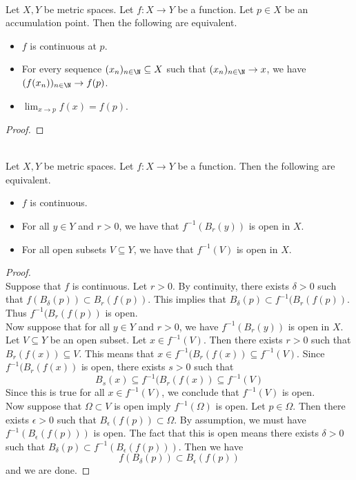\documentclass[a4paper]{article}
\begin{document}
\begin{prp}{}{}\\
Let $X,Y$ be metric spaces. Let $f:X\to Y$ be a function. Let $p\in X$ be an accumulation point. Then the following are equivalent. 
\begin{itemize}
\item $f$ is continuous at $p$. 
\item For every sequence $(x_n)_{n\in\N}\subseteq X$ such that $(x_n)_{n\in\N}\to x$, we have $(f(x_n))_{n\in\N}\to f(p)$. 
\item $\lim_{x\to p}f(x)=f(p)$. 
\end{itemize}
\begin{proof}
\end{proof}
\end{prp}

\begin{prp}{}{}\\
Let $X,Y$ be metric spaces. Let $f:X\to Y$ be a function. Then the following are equivalent. 
\begin{itemize}
\item $f$ is continuous. 
\item For all $y\in Y$ and $r>0$, we have that $f^{-1}(B_r(y))$ is open in $X$. 
\item For all open subsets $V\subseteq Y$, we have that $f^{-1}(V)$ is open in $X$. 
\end{itemize}
\begin{proof}\\
Suppose that $f$ is continuous. Let $r>0$. By continuity, there exists $\delta>0$ such that $f(B_\delta(p))\subset B_r(f(p))$. This implies that $B_\delta(p)\subset f^{-1}(B_r(f(p))$. Thus $f^{-1}(B_r(f(p))$ is open. \\

Now suppose that for all $y\in Y$ and $r>0$, we have $f^{-1}(B_r(y))$ is open in $X$. Let $V\subseteq Y$ be an open subset. Let $x\in f^{-1}(V)$. Then there exists $r>0$ such that $B_r(f(x))\subseteq V$. This means that $x\in f^{-1}(B_r(f(x))\subseteq f^{-1}(V)$. Since $f^{-1}(B_r(f(x))$ is open, there exists $s>0$ such that $$B_s(x)\subseteq f^{-1}(B_r(f(x))\subseteq f^{-1}(V)$$ Since this is true for all $x\in f^{-1}(V)$, we conclude that $f^{-1}(V)$ is open. \\

Now suppose that $\Omega\subset V$ is open imply $f^{-1}(\Omega)$ is open. Let $p\in \Omega$. Then there exists $\epsilon>0$ such that $B_{\epsilon}(f(p))\subset\Omega$. By assumption, we must have $f^{-1}(B_{\epsilon}(f(p)))$ is open. The fact that this is open means there exists $\delta>0$ such that $B_{\delta}(p)\subset f^{-1}(B_{\epsilon}(f(p)))$. Then we have $$f(B_{\delta}(p))\subset B_{\epsilon}(f(p))$$ and we are done. 
\end{proof}
\end{prp}
\end{document}
